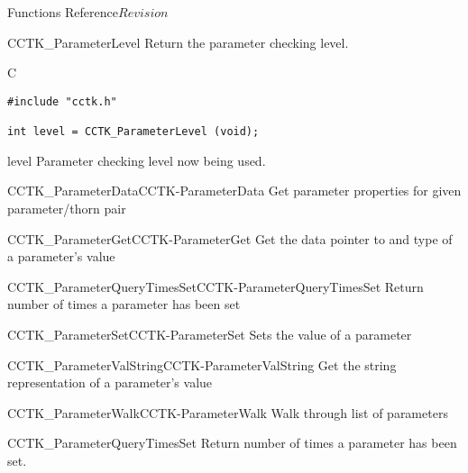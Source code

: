 \begin{cactuspart}{ Functions Reference}{}{$Revision$}
\begin{FunctionDescription}{CCTK\_ParameterLevel}
\label{CCTK-ParameterLevel}
Return the parameter checking level.

\begin{SynopsisSection}
\begin{Synopsis}{C}
\begin{verbatim}
#include "cctk.h"

int level = CCTK_ParameterLevel (void);
\end{verbatim}
\end{Synopsis}
\end{SynopsisSection}

\begin{ResultSection}
\begin{Result}{level}
Parameter checking level now being used.
\end{Result}
\end{ResultSection}

\begin{SeeAlsoSection}
\begin{SeeAlso2}{CCTK\_ParameterData}{CCTK-ParameterData}
  Get parameter properties for given parameter/thorn pair
\end{SeeAlso2}
\begin{SeeAlso2}{CCTK\_ParameterGet}{CCTK-ParameterGet}
  Get the data pointer to and type of a parameter's value
\end{SeeAlso2}
\begin{SeeAlso2}{CCTK\_ParameterQueryTimesSet}{CCTK-ParameterQueryTimesSet}
  Return number of times a parameter has been set
\end{SeeAlso2}
\begin{SeeAlso2}{CCTK\_ParameterSet}{CCTK-ParameterSet}
  Sets the value of a parameter
\end{SeeAlso2}
\begin{SeeAlso2}{CCTK\_ParameterValString}{CCTK-ParameterValString}
  Get the string representation of a parameter's value
\end{SeeAlso2}
\begin{SeeAlso2}{CCTK\_ParameterWalk}{CCTK-ParameterWalk}
  Walk through list of parameters
\end{SeeAlso2}
\end{SeeAlsoSection}
\end{FunctionDescription}


\begin{FunctionDescription}{CCTK\_ParameterQueryTimesSet}
\label{CCTK-ParameterQueryTimesSet}
Return number of times a parameter has been set.


\end{FunctionDescription}
\end{cactuspart}
